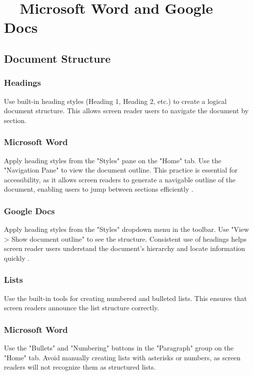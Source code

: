 \section{~~Microsoft Word and Google Docs}\label{ch15:sec:word-docs}

\subsection{Document Structure}\label{ch15:ssec:doc-structure}

\subsubsection{Headings}\label{ch15:sssec:headings}
Use built-in heading styles (Heading 1, Heading 2, etc.) to create a logical document structure. This allows screen reader users to navigate the document by section.

\subsubsection{Microsoft Word}\label{ch15:sssec:word-headings}
Apply heading styles from the "Styles" pane on the "Home" tab. Use the "Navigation Pane" to view the document outline. This practice is essential for accessibility, as it allows screen readers to generate a navigable outline of the document, enabling users to jump between sections efficiently \supercite{MicrosoftAccessibility}.

\subsubsection{Google Docs}\label{ch15:sssec:docs-headings}
Apply heading styles from the "Styles" dropdown menu in the toolbar. Use "View > Show document outline" to see the structure. Consistent use of headings helps screen reader users understand the document's hierarchy and locate information quickly \supercite{GoogleAccessibility}.

\subsubsection{Lists}\label{ch15:sssec:lists}
Use the built-in tools for creating numbered and bulleted lists. This ensures that screen readers announce the list structure correctly.

\subsubsection{Microsoft Word}\label{ch15:sssec:word-lists}
Use the "Bullets" and "Numbering" buttons in the "Paragraph" group on the "Home" tab. Avoid manually creating lists with asterisks or numbers, as screen readers will not recognize them as structured lists.

